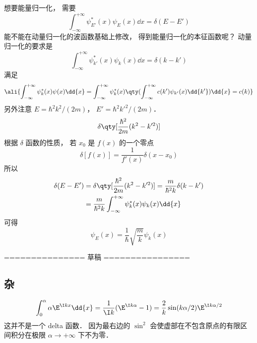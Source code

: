 想要能量归一化， 需要
\begin{equation}
\int_{-\infty}^{+\infty} \psi_{E'}^*(x) \psi_E(x) \dd{x}  = \delta (E - E')
\end{equation}
能不能在动量归一化的波函数基础上修改， 得到能量归一化的本征函数呢？
动量归一化的要求是
\begin{equation}
\int_{-\infty}^{+\infty} \psi_{k'}^*(x) \psi_k(x) \dd{x}  = \delta(k - k')
\end{equation}
满足
\begin{equation}\ali{
\int_{-\infty}^{+\infty} \psi_k^*(x) \psi(x) \dd{x}
= \int_{-\infty}^{+\infty} \psi_k^*(x) \qty(\int_{-\infty}^{+\infty} c(k')\psi_{k'}(x) \dd{k'}) \dd{x}
= c(k)
}\end{equation}
另外注意 $E = \hbar ^2 k^2/(2m)$， $E' = \hbar^2k'^2/(2m)$． 
\begin{equation}
\delta \qty[ \frac{\hbar ^2}{2m}(k^2 - k'^2)]
\end{equation}
根据 $\delta $ 函数的性质， 若 $x_0$ 是 $f(x)$ 的一个零点
\begin{equation}
\delta[f(x)] = \frac{1}{f'(x)}\delta (x - x_0)
\end{equation}
所以
\begin{equation}
\begin{aligned}
\delta (E - E') & = \delta \qty[\frac{\hbar^2}{2m}(k^2 - k'^2)] = \frac{m}{\hbar ^2 k}\delta (k - k') \\
&= \frac{m}{\hbar^2 k}\int_{-\infty }^{+\infty } \psi_k^*(x) \psi_k(x)\dd{x} 
\end{aligned}
\end{equation}
可得
\begin{equation}
\psi_E (x) = \frac{1}{\hbar} \sqrt{\frac{m}{k}} \psi_k(x)
\end{equation}


=============== 草稿 ================



\subsection{杂}
\begin{equation}
\int_0^\alpha\alpha \E^{\I kx} \dd{x} = \frac{1}{\I k} (\E^{\I k\alpha} - 1)
= \frac{2}{ k} \sin(k\alpha/2) \E^{\I k\alpha/2}
\end{equation}
这并不是一个 delta 函数． 因为最右边的 $\sin^2$ 会使虚部在不包含原点的有限区间积分在极限 $\alpha \to +\infty$ 下不为零．

